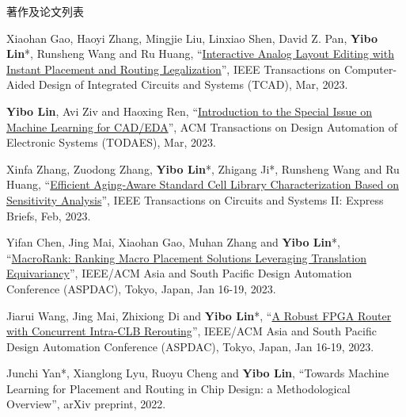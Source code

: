 \begin{rSection}{著作及论文列表}
\begin{description}[font=\normalfont, rightmargin=2em]
{}
            

\item[{[J111]}]{
        Xiaohan Gao, Haoyi Zhang, Mingjie Liu, Linxiao Shen, David Z. Pan, \textbf{Yibo Lin}*, Runsheng Wang and Ru Huang, 
    ``\href{https://doi.org/10.1109/TCAD.2022.3190234}{Interactive Analog Layout Editing with Instant Placement and Routing Legalization}'', 
    IEEE Transactions on Computer-Aided Design of Integrated Circuits and Systems (TCAD), Mar, 2023.
    
}
            

\item[{[J110]}]{
        \textbf{Yibo Lin}, Avi Ziv and Haoxing Ren, 
    ``\href{https://doi.org/10.1145/3586208}{Introduction to the Special Issue on Machine Learning for CAD/EDA}'', 
    ACM Transactions on Design Automation of Electronic Systems (TODAES), Mar, 2023.
    
}
            

\item[{[J109]}]{
        Xinfa Zhang, Zuodong Zhang, \textbf{Yibo Lin}*, Zhigang Ji*, Runsheng Wang and Ru Huang, 
    ``\href{https://doi.org/10.1109/TCSII.2022.3212123}{Efficient Aging-Aware Standard Cell Library Characterization Based on Sensitivity Analysis}'', 
    IEEE Transactions on Circuits and Systems II: Express Briefs, Feb, 2023.
    
}
            

\item[{[C108]}]{
        Yifan Chen, Jing Mai, Xiaohan Gao, Muhan Zhang and \textbf{Yibo Lin}*, 
    ``\href{https://doi.org/10.1145/3566097.3567899}{MacroRank: Ranking Macro Placement Solutions Leveraging Translation Equivariancy}'', 
    IEEE/ACM Asia and South Pacific Design Automation Conference (ASPDAC), Tokyo, Japan, Jan 16-19, 2023.
    
}
            

\item[{[C107]}]{
        Jiarui Wang, Jing Mai, Zhixiong Di and \textbf{Yibo Lin}*, 
    ``\href{https://doi.org/10.1145/3566097.3567898}{A Robust FPGA Router with Concurrent Intra-CLB Rerouting}'', 
    IEEE/ACM Asia and South Pacific Design Automation Conference (ASPDAC), Tokyo, Japan, Jan 16-19, 2023.
    
}
            

\item[{[J106]}]{
        Junchi Yan*, Xianglong Lyu, Ruoyu Cheng and \textbf{Yibo Lin}, 
    ``Towards Machine Learning for Placement and Routing in Chip Design: a Methodological Overview'', 
    arXiv preprint, 2022.
    
}
\end{description}
\end{rSection}
